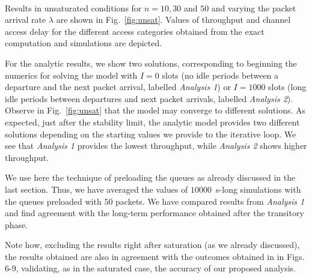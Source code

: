 \documentclass[preprint,12pt]{elsarticle}
\begin{document}
\begin{figure*}[!tb]
\centering
{}
\\
\caption{Performance results in unsaturated conditions. Comparison among the two solutions derived from the exact analysis and simulations.}
\label{fig:unsat}
\end{figure*}


Results in unsaturated conditions for $n=10,30$ and $50$ and varying the packet arrival rate $\lambda$ are shown in Fig.~\ref{fig:unsat}. Values of throughput and channel access delay for the different access categories obtained from the exact computation and simulations are depicted. 

For the analytic results, we show two solutions, corresponding to beginning the numerics for solving the model with $I = 0$ slots (no idle periods between a departure and the next packet arrival, labelled \emph{Analysis 1}) or $I=1000$ slots (long idle periods between departures and next packet arrivals, labelled \emph{Analysis 2}). Observe in Fig.~\ref{fig:unsat} that the model may converge to different solutions. As expected, just after the stability limit, the analytic model provides two different solutions depending on the starting values we provide to the iterative loop. We see that \emph{Analysis 1} provides the lowest throughput, while \emph{Analysis 2} shows higher throughput.

We use here the technique of preloading the queues as already discussed in the last section. Thus, we have averaged the values of $10000$~s-long simulations with the queues preloaded with $50$ packets. We have compared results from \emph{Analysis 1} and find agreement with the long-term performance obtained after the transitory phase. 

Note how, excluding the results right after saturation (as we already discussed), the results obtained are also in agreement with the outcomes obtained in \cite{chung2006performance} in Figs. 6-9, validating, as in the saturated case, the accuracy of our proposed analysis.
\end{document}
